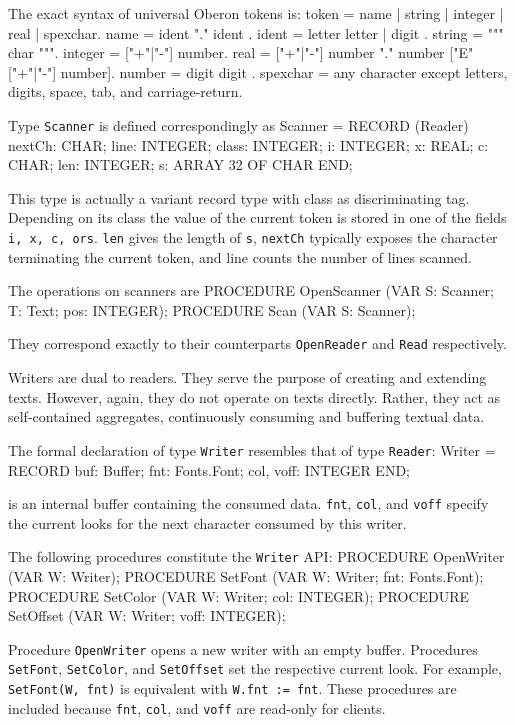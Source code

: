 The exact syntax of universal Oberon tokens is:
\begintt
token = name | string | integer | real | spexchar.
name = ident { "." ident }.
ident = letter { letter | digit }.
string = """ { char } """.
integer = ["+"|"-"] number.
real = ["+"|"-"] number "." number ["E" ["+"|"-"] number].
number = digit { digit }.
spexchar = any character except letters, digits, space, tab, and carriage-return.
\endtt

\noindent Type {\tt Scanner\/} is defined correspondingly as
\begintt
Scanner = RECORD (Reader)
  nextCh: CHAR;
  line: INTEGER;
  class: INTEGER;
  i: INTEGER;
  x: REAL;
  c: CHAR;
  len: INTEGER;
  s: ARRAY 32 OF CHAR
END;
\endtt

\noindent This type is actually a variant record type with class as
discriminating tag. Depending on its class the value of the current
token is stored in one of the fields {\tt i\/}{\tt , x\/}{\tt , c\/}{\tt , or\/}{\tt  s\/}. {\tt len\/} gives the length of {\tt s\/}, {\tt nextCh\/} typically exposes the character terminating the current token, and line counts the number of lines scanned.

The operations on scanners are
\begintt
PROCEDURE OpenScanner (VAR S: Scanner; T: Text; pos: INTEGER);
PROCEDURE Scan (VAR S: Scanner);
\endtt

\noindent They correspond exactly to their counterparts {\tt OpenReader\/} and {\tt Read\/} respectively.

Writers are dual to readers. They serve the purpose of creating and
extending texts. However, again, they do not operate on texts
directly. Rather, they act as self-contained aggregates, continuously
consuming and buffering textual data.

The formal declaration of type {\tt Writer\/} resembles that of type {\tt Reader\/}:
\begintt
Writer = RECORD buf:
  Buffer;
  fnt: Fonts.Font;
  col, voff: INTEGER
END;
\endtt

 is an internal buffer containing the consumed data. {\tt fnt\/}, {\tt col\/}, and {\tt voff\/} specify the current looks for the next character consumed by this writer.

The following procedures constitute the {\tt Writer\/} API:
\begintt
PROCEDURE OpenWriter (VAR W: Writer);
PROCEDURE SetFont (VAR W: Writer; fnt: Fonts.Font);
PROCEDURE SetColor (VAR W: Writer; col: INTEGER);
PROCEDURE SetOffset (VAR W: Writer; voff: INTEGER);
\endtt

\noindent Procedure {\tt OpenWriter\/} opens a new writer with an empty buffer. Procedures {\tt SetFont\/}, {\tt SetColor\/}, and {\tt SetOffset\/} set the respective current look. For example,
{\tt SetFont(W, fnt)\/} is equivalent with {\tt W.fnt := fnt\/}.
These procedures are included because {\tt fnt\/}, {\tt col\/}, and {\tt voff\/} are read-only for clients.

